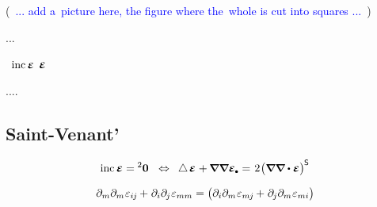 \noindent(~\textcolor{blue}{... add a~picture here, the figure where the~whole is cut into squares ...}~)

...

~${\operatorname{inc} \infinitesimaldeformation}$  ${\infinitesimaldeformation}$

....


\subsection*{Saint\hbox{-\hspace{-0.2ex}}Venant’}


\nopagebreak\vspace{-0.2em}
\begin{equation*}
\operatorname{inc} \infinitesimaldeformation = \hspace{-0.07ex} \zerobivalent
\hspace{.6em} \Leftrightarrow \hspace{.5em}
\Laplacian \hspace{.2ex} \infinitesimaldeformation \hspace{.1ex} + \hspace{-0.1ex} \boldnabla \boldnabla \infinitesimaldeformation\tracedot
\hspace{.2ex} = \hspace{.2ex}
2 \hspace{.1ex} \bigl( \boldnabla \boldnabla \dotp \infinitesimaldeformation \bigr)^{\hspace{-0.1ex}\mathsf{S}}
\end{equation*}

\noindent
{}

\nopagebreak\vspace{-0.2em}
\begin{equation*}
\partial_{m} \partial_{m} \hspace{.123ex}\varepsilon_{i\hspace{-0.1ex}j}
\hspace{-0.1ex} + \hspace{.1ex}
\partial_{i} \partial_{\hspace{-0.1ex}j} \hspace{.123ex}\varepsilon_{mm}
=
\bigl( \partial_{i} \partial_{m} \hspace{.123ex}\varepsilon_{m\hspace{-0.1ex}j}
\hspace{-0.1ex} + \hspace{.1ex}
\partial_{\hspace{-0.1ex}j} \partial_{m} \hspace{.123ex}\varepsilon_{mi} \bigr)
\end{equation*}

